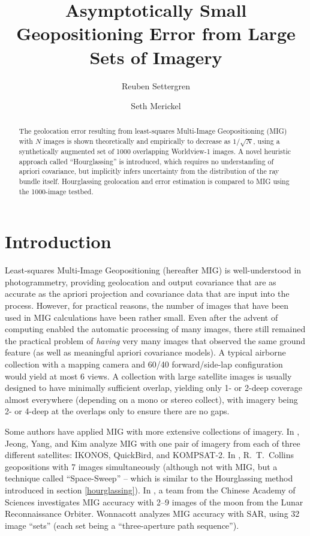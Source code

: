 \documentclass[11pt]{amsart}
\begin{document}
\newcommand{\Iimg}{\mathcal{I}}
\newcommand{\Pimg}{\mathcal{P}}

\title[Small Geopositioning Error from Many Images]
{Asymptotically Small Geopositioning Error from Large Sets of Imagery}
\author[Settergren]{Reuben Settergren}
\author[Merickel]{Seth Merickel}

\begin{abstract}
The geolocation error resulting from least-squares Multi-Image Geopositioning
(MIG) with $N$ images is shown theoretically and empirically to decrease as
$1/\sqrt{N}$, using a synthetically augmented set of 1000 overlapping
Worldview-1 images. A novel heuristic approach called ``Hourglassing'' is
introduced, which requires no understanding of apriori covariance, but
implicitly infers uncertainty from the distribution of the ray bundle
itself. Hourglassing geolocation and error estimation is compared to MIG using
the 1000-image testbed.
\end{abstract}
\maketitle

\section{Introduction}
Least-squares Multi-Image Geopositioning (hereafter MIG) is well-under\-stood in
photogrammetry\cite{LSQRMIG}, providing geolocation and output covariance that
are as accurate as the apriori projection and covariance data that are input
into the process. However, for practical reasons, the number of images that have
been used in MIG calculations have been rather small. Even after the advent of
computing enabled the automatic processing of many images, there still remained
the practical problem of {\em having} very many images that observed the same
ground feature (as well as meaningful apriori covariance models). A typical
airborne collection with a mapping camera and 60/40 forward/side-lap
configuration would yield at most 6 views. A collection with large satellite
images is usually designed to have minimally sufficient overlap, yielding only
1- or 2-deep coverage almost everywhere (depending on a mono or stereo collect),
with imagery being 2- or 4-deep at the overlaps only to ensure there are no gaps.

Some authors have applied MIG with more extensive collections of imagery. In
\cite{JEONG_SIX}, Jeong, Yang, and Kim analyze MIG with one pair of imagery from
each of three different satellites: IKONOS, QuickBird, and KOMPSAT-2. In
\cite{PLANE_COLLINS}, R.~T.~Collins geopositions with 7 images simultaneously
(although not with MIG, but a technique called ``Space-Sweep'' -- which is
similar to the Hourglassing method introduced in section \ref{hourglassing}).
In \cite{LRO_NINE}, a team from the Chinese Academy of Sciences investigates MIG
accuracy with 2--9 images of the moon from the Lunar Reconnaissance
Orbiter. Wonnacott \cite{WONNACOT_32_3} analyzes MIG accuracy with SAR, using 32
image ``sets'' (each set being a ``three-aperture path sequence'').
\end{document}
